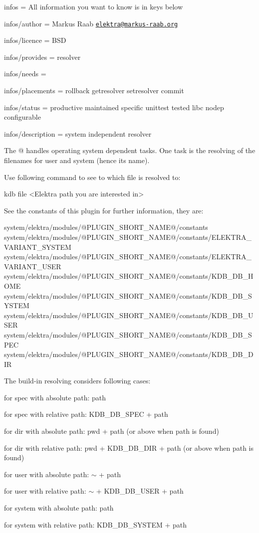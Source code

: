 
\begin{DoxyItemize}
\item infos = All information you want to know is in keys below
\item infos/author = Markus Raab \href{mailto:elektra@markus-raab.org}{\tt elektra@markus-\/raab.\+org}
\item infos/licence = B\+SD
\item infos/provides = resolver
\item infos/needs =
\item infos/placements = rollback getresolver setresolver commit
\item infos/status = productive maintained specific unittest tested libc nodep configurable
\item infos/description = system independent resolver
\end{DoxyItemize}

The @ handles operating system dependent tasks. One task is the resolving of the filenames for user and system (hence its name).

Use following command to see to which file is resolved to\+: \begin{DoxyVerb}kdb file <Elektra path you are interested in>
\end{DoxyVerb}


See the constants of this plugin for further information, they are\+: \begin{DoxyVerb}system/elektra/modules/@PLUGIN_SHORT_NAME@/constants
system/elektra/modules/@PLUGIN_SHORT_NAME@/constants/ELEKTRA_VARIANT_SYSTEM
system/elektra/modules/@PLUGIN_SHORT_NAME@/constants/ELEKTRA_VARIANT_USER
system/elektra/modules/@PLUGIN_SHORT_NAME@/constants/KDB_DB_HOME
system/elektra/modules/@PLUGIN_SHORT_NAME@/constants/KDB_DB_SYSTEM
system/elektra/modules/@PLUGIN_SHORT_NAME@/constants/KDB_DB_USER
system/elektra/modules/@PLUGIN_SHORT_NAME@/constants/KDB_DB_SPEC
system/elektra/modules/@PLUGIN_SHORT_NAME@/constants/KDB_DB_DIR
\end{DoxyVerb}


The build-\/in resolving considers following cases\+:


\begin{DoxyItemize}
\item for spec with absolute path\+: path
\item for spec with relative path\+: K\+D\+B\+\_\+\+D\+B\+\_\+\+S\+P\+EC + path
\item for dir with absolute path\+: {\ttfamily pwd} + path (or above when path is found)
\item for dir with relative path\+: {\ttfamily pwd} + K\+D\+B\+\_\+\+D\+B\+\_\+\+D\+IR + path (or above when path is found)
\item for user with absolute path\+: $\sim$ + path
\item for user with relative path\+: $\sim$ + K\+D\+B\+\_\+\+D\+B\+\_\+\+U\+S\+ER + path
\item for system with absolute path\+: path
\item for system with relative path\+: K\+D\+B\+\_\+\+D\+B\+\_\+\+S\+Y\+S\+T\+EM + path
\end{DoxyItemize}

